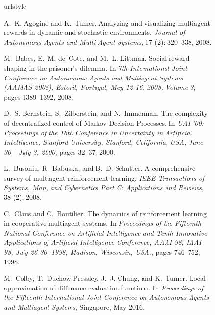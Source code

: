 \documentclass{article}
\begin{document}
\begin{SCfigure}
\FloatBarrier




\begin{thebibliography}{40}
\providecommand{\natexlab}[1]{#1}
\providecommand{\url}[1]{\texttt{#1}}
\expandafter\ifx\csname urlstyle\endcsname\relax
  \providecommand{\doi}[1]{doi: #1}\else
  \providecommand{\doi}{doi: \begingroup \urlstyle{rm}\Url}\fi

A.~K. Agogino and K.~Tumer.
\newblock Analyzing and visualizing multiagent rewards in dynamic and
  stochastic environments.
\newblock \emph{Journal of Autonomous Agents and Multi-Agent Systems},
  17 (2): 320--338, 2008.

M.~Babes, E.~M. de~Cote, and M.~L. Littman.
\newblock Social reward shaping in the prisoner's dilemma.
\newblock In \emph{7th International Joint Conference on Autonomous Agents and
  Multiagent Systems {(AAMAS} 2008), Estoril, Portugal, May 12-16, 2008, Volume
  3}, pages 1389--1392, 2008.

D.~S. Bernstein, S.~Zilberstein, and N.~Immerman.
\newblock The complexity of decentralized control of {Markov Decision
  Processes}.
\newblock In \emph{{UAI} '00: Proceedings of the 16th Conference in Uncertainty
  in Artificial Intelligence, Stanford University, Stanford, California, USA,
  June 30 - July 3, 2000}, pages 32--37, 2000.

L.~Busoniu, R.~Babuska, and B.~D. Schutter.
\newblock A comprehensive survey of multiagent reinforcement learning.
\newblock \emph{IEEE Transactions of Systems, Man, and Cybernetics Part C:
  Applications and Reviews}, 38 (2), 2008.

C.~Claus and C.~Boutilier.
\newblock The dynamics of reinforcement learning in cooperative multiagent
  systems.
\newblock In \emph{Proceedings of the Fifteenth National Conference on
  Artificial Intelligence and Tenth Innovative Applications of Artificial
  Intelligence Conference, {AAAI} 98, {IAAI} 98, July 26-30, 1998, Madison,
  Wisconsin, {USA.}}, pages 746--752, 1998.

M.~Colby, T.~Duchow-Pressley, J.~J. Chung, and K.~Tumer.
\newblock Local approximation of difference evaluation functions.
\newblock In \emph{Proceedings of the Fifteenth International Joint Conference
  on Autonomous Agents and Multiagent Systems}, Singapore, May 2016.


\end{thebibliography}
\end{SCfigure}
\end{document}

